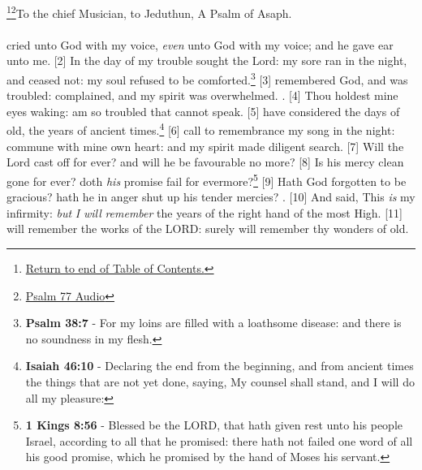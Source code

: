 \footnote{\textcolor[rgb]{0.00,0.25,0.00}{\hyperlink{TOC}{Return to end of Table of Contents.}}}\footnote{\href{https://audiobible.com/bible/psalms_77.html}{\textcolor[cmyk]{0.99998,1,0,0}{Psalm 77 Audio}}}\textcolor[cmyk]{0.99998,1,0,0}{To the chief Musician, to Jeduthun, A Psalm of Asaph.}\\
\\
\textcolor[cmyk]{0.99998,1,0,0}{ cried unto God with my voice, \emph{even} unto God with my voice; and he gave ear unto me.}
[2] \textcolor[cmyk]{0.99998,1,0,0}{In the day of my trouble  sought the Lord: my sore ran in the night, and ceased not: my soul refused to be comforted.}\footnote{\textbf{Psalm 38:7} - For my loins are filled with a loathsome disease: and there is no soundness in my flesh.}
[3] \textcolor[cmyk]{0.99998,1,0,0}{ remembered God, and was troubled:  complained, and my spirit was overwhelmed. .}
[4] \textcolor[cmyk]{0.99998,1,0,0}{Thou holdest mine eyes waking:  am so troubled that  cannot speak.}
[5] \textcolor[cmyk]{0.99998,1,0,0}{ have considered the days of old, the years of ancient times.}\footnote{\textbf{Isaiah 46:10} - Declaring the end from the beginning, and from ancient times the things that are not yet done, saying, My counsel shall stand, and I will do all my pleasure:}
[6] \textcolor[cmyk]{0.99998,1,0,0}{ call to remembrance my song in the night:  commune with mine own heart: and my spirit made diligent search.}
[7] \textcolor[cmyk]{0.99998,1,0,0}{Will the Lord cast off for ever? and will he be favourable no more?}
[8] \textcolor[cmyk]{0.99998,1,0,0}{Is his mercy clean gone for ever? doth \emph{his} promise fail for evermore?}\footnote{\textbf{1 Kings 8:56} - Blessed be the LORD, that hath given rest unto his people Israel, according to all that he promised: there hath not failed one word of all his good promise, which he promised by the hand of Moses his servant.}
[9] \textcolor[cmyk]{0.99998,1,0,0}{Hath God forgotten to be gracious? hath he in anger shut up his tender mercies? .}
[10] \textcolor[cmyk]{0.99998,1,0,0}{And  said, This \emph{is} my infirmity: \emph{but} \emph{I} \emph{will} \emph{remember} the years of the right hand of the most High.}
[11] \textcolor[cmyk]{0.99998,1,0,0}{ will remember the works of the LORD: surely  will remember thy wonders of old.}
